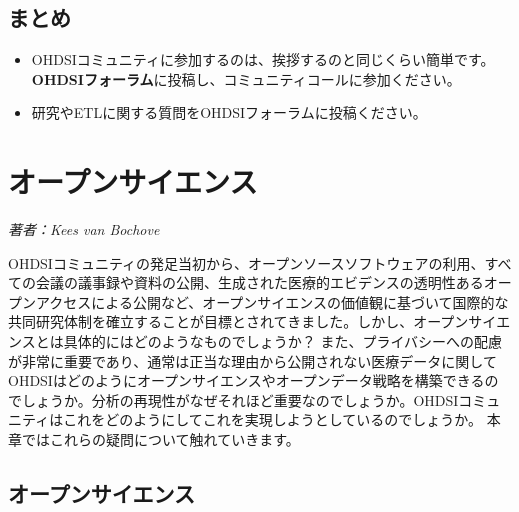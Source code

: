 \documentclass[
  11pt]{book}
\makeatletter
\providecommand{\tightlist}{%
  \setlength{\itemsep}{0pt}\setlength{\parskip}{0pt}}
\newenvironment{kframe}{%
\medskip{}
\setlength{\fboxsep}{.8em}
 \def\at@end@of@kframe{}%
 \ifinner\ifhmode%
  \def\at@end@of@kframe{\end{minipage}}%
  \begin{minipage}{\columnwidth}%
 \fi\fi%
 \def\FrameCommand##1{\hskip\@totalleftmargin \hskip-\fboxsep
 \colorbox{myShadeColor}{##1}\hskip-\fboxsep
     \hskip-\linewidth \hskip-\@totalleftmargin \hskip\columnwidth}%
 \MakeFramed {\advance\hsize-\width
   \@totalleftmargin\z@ \linewidth\hsize
   \@setminipage}}%
 {\par\unskip\endMakeFramed%
 \at@end@of@kframe}
\newenvironment{rmdblock}[1]
  {
  \begin{itemize}
  \renewcommand{\labelitemi}{
    \raisebox{-.7\height}[0pt][0pt]{
      {\setkeys{Gin}{width=3em,keepaspectratio}\texttt{[image: images/\#1]}}
    }
  }
  \setlength{\fboxsep}{1em}
  \begin{kframe}
  \item
  }
  {
  \end{kframe}
  \end{itemize}
  }
\newenvironment{rmdsummary}
  {\begin{rmdblock}{summary}}
  {\end{rmdblock}}
\theoremstyle{definition}
\theoremstyle{definition}
\theoremstyle{definition}
\theoremstyle{definition}
\theoremstyle{remark}
\makeatother
\begin{document}
\section{まとめ}\label{ux307eux3068ux3081-1}

\begin{rmdsummary}
\begin{itemize}
\tightlist
\item
  OHDSIコミュニティに参加するのは、挨拶するのと同じくらい簡単です。\textbf{OHDSIフォーラム}に投稿し、コミュニティコールに参加ください。
\item
  研究やETLに関する質問をOHDSIフォーラムに投稿ください。
\end{itemize}
\end{rmdsummary}

\chapter{オープンサイエンス}\label{OpenScience}


\emph{著者：Kees van Bochove}

OHDSIコミュニティの発足当初から、オープンソースソフトウェアの利用、すべての会議の議事録や資料の公開、生成された医療的エビデンスの透明性あるオープンアクセスによる公開など、オープンサイエンスの価値観に基づいて国際的な共同研究体制を確立することが目標とされてきました。しかし、オープンサイエンスとは具体的にはどのようなものでしょうか？ また、プライバシーへの配慮が非常に重要であり、通常は正当な理由から公開されない医療データに関してOHDSIはどのようにオープンサイエンスやオープンデータ戦略を構築できるのでしょうか。分析の再現性がなぜそれほど重要なのでしょうか。OHDSIコミュニティはこれをどのようにしてこれを実現しようとしているのでしょうか。 本章ではこれらの疑問について触れていきます。

\section{オープンサイエンス}\label{ux30aaux30fcux30d7ux30f3ux30b5ux30a4ux30a8ux30f3ux30b9}
\end{document}
